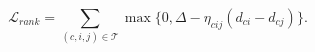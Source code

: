 \begingroup{}
\begin{equation}
\label{eq:ranking-loss}
\mathcal{L}_{rank}=\sum_{(c,i,j)\in\mathcal{T}}\max\bigl\{0,\Delta-\eta_{cij}(d_{ci}-d_{cj})\bigr\}.
\end{equation}
\endgroup
